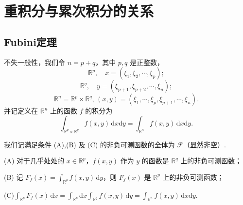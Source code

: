 \documentclass[../../main.tex]{subfiles}
\begin{document}
\section{重积分与累次积分的关系}

\subsection{Fubini定理}

\begin{definition}
不失一般性，我们令 \( n = p + q \)，其中 \( p, q \) 是正整数，
\[
\mathbb{R}^p, \quad x = (\xi_1, \xi_2, \cdots, \xi_p);
\]
\[
\mathbb{R}^q, \quad y = (\xi_{p + 1}, \xi_{p + 2}, \cdots, \xi_n);
\]
\[
\mathbb{R}^n = \mathbb{R}^p \times \mathbb{R}^q, \, (x, y) = (\xi_1, \cdots, \xi_p, \xi_{p + 1}, \cdots, \xi_n).
\]
并记定义在 \( \mathbb{R}^n \) 上的函数 \( f \) 的积分为
\[
\int_{\mathbb{R}^p \times \mathbb{R}^q} f(x, y) \, \mathrm{d}x\mathrm{d}y = \int_{\mathbb{R}^n} f(x, y) \, \mathrm{d}x\mathrm{d}y.
\]
\end{definition}

\begin{definition}
我们记满足条件 (A),(B) 及 (C) 的非负可测函数的全体为 \( \mathcal{F} \)（显然非空）.

(A) 对于几乎处处的 \( x \in \mathbb{R}^p \)，\( f(x, y) \) 作为 \( y \) 的函数是 \( \mathbb{R}^q \) 上的非负可测函数；

(B) 记 \( F_f(x) = \int_{\mathbb{R}^q} f(x, y) \, \mathrm{d}y \)，则 \( F_f(x) \) 是 \( \mathbb{R}^p \) 上的非负可测函数；

(C)$\int_{\mathbb{R}^p} F_f(x) \, \mathrm{d}x = \int_{\mathbb{R}^p} \mathrm{d}x \int_{\mathbb{R}^q} f(x, y) \, \mathrm{d}y = \int_{\mathbb{R}^n} f(x, y) \, \mathrm{d}x\mathrm{d}y.$
\end{definition}
\end{document}
